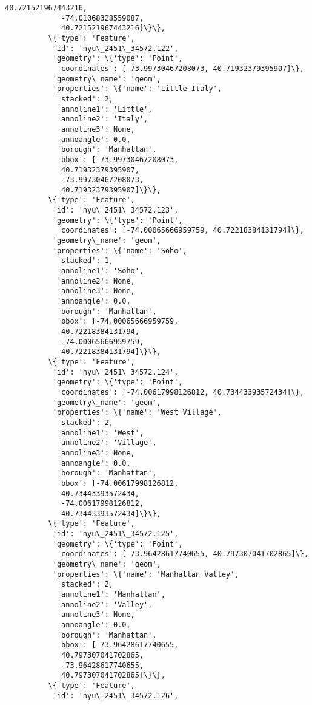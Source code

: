 \documentclass[11pt]{article}
\begin{document}
\begin{Verbatim}[commandchars=\\\{\}]
             40.721521967443216,
             -74.01068328559087,
             40.721521967443216]\}\},
          \{'type': 'Feature',
           'id': 'nyu\_2451\_34572.122',
           'geometry': \{'type': 'Point',
            'coordinates': [-73.99730467208073, 40.71932379395907]\},
           'geometry\_name': 'geom',
           'properties': \{'name': 'Little Italy',
            'stacked': 2,
            'annoline1': 'Little',
            'annoline2': 'Italy',
            'annoline3': None,
            'annoangle': 0.0,
            'borough': 'Manhattan',
            'bbox': [-73.99730467208073,
             40.71932379395907,
             -73.99730467208073,
             40.71932379395907]\}\},
          \{'type': 'Feature',
           'id': 'nyu\_2451\_34572.123',
           'geometry': \{'type': 'Point',
            'coordinates': [-74.00065666959759, 40.72218384131794]\},
           'geometry\_name': 'geom',
           'properties': \{'name': 'Soho',
            'stacked': 1,
            'annoline1': 'Soho',
            'annoline2': None,
            'annoline3': None,
            'annoangle': 0.0,
            'borough': 'Manhattan',
            'bbox': [-74.00065666959759,
             40.72218384131794,
             -74.00065666959759,
             40.72218384131794]\}\},
          \{'type': 'Feature',
           'id': 'nyu\_2451\_34572.124',
           'geometry': \{'type': 'Point',
            'coordinates': [-74.00617998126812, 40.73443393572434]\},
           'geometry\_name': 'geom',
           'properties': \{'name': 'West Village',
            'stacked': 2,
            'annoline1': 'West',
            'annoline2': 'Village',
            'annoline3': None,
            'annoangle': 0.0,
            'borough': 'Manhattan',
            'bbox': [-74.00617998126812,
             40.73443393572434,
             -74.00617998126812,
             40.73443393572434]\}\},
          \{'type': 'Feature',
           'id': 'nyu\_2451\_34572.125',
           'geometry': \{'type': 'Point',
            'coordinates': [-73.96428617740655, 40.797307041702865]\},
           'geometry\_name': 'geom',
           'properties': \{'name': 'Manhattan Valley',
            'stacked': 2,
            'annoline1': 'Manhattan',
            'annoline2': 'Valley',
            'annoline3': None,
            'annoangle': 0.0,
            'borough': 'Manhattan',
            'bbox': [-73.96428617740655,
             40.797307041702865,
             -73.96428617740655,
             40.797307041702865]\}\},
          \{'type': 'Feature',
           'id': 'nyu\_2451\_34572.126',

\end{Verbatim}
\end{document}
